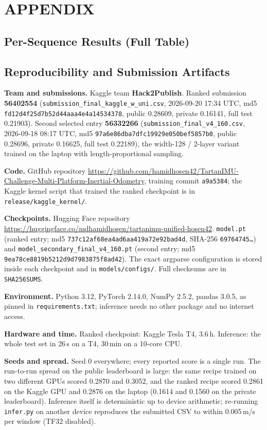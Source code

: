 \documentclass[letterpaper,10pt,conference]{ieeeconf}
\newcommand{\hfrepo}{\url{https://huggingface.co/mdhamidhosen/tartanimu-unified-hosen42}}
\newcommand{\ghrepo}{\url{https://github.com/hamidhosen42/TartanIMU-Challenge-Multi-Platform-Inertial-Odometry}}
\begin{document}
\section*{APPENDIX}
\subsection{Per-Sequence Results (Full Table)}


\subsection{Reproducibility and Submission Artifacts}
\label{sec:selection}
\begin{sloppypar}\raggedright
\textbf{Team and submissions.} Kaggle team \textbf{Hack2Publish}. Ranked submission \textbf{56402554}
(\texttt{submission\_final\_kaggle\_w\_uni.csv}, 2026-09-20 17:34 UTC, md5 \texttt{fd12d4f25d7b52d44aaa4e4a14534378},
public 0.28609, private 0.16141, full test 0.21903). Second selected entry \textbf{56332266} (\texttt{submission\_final\_v4\_160.csv},
2026-09-18 08:17 UTC, md5 \texttt{97a6e86dba7dfc19929e050bef5857b0}, public 0.28696, private 0.16625, full test 0.22189), the
width-128 / 2-layer variant trained on the laptop with length-proportional sampling.

\textbf{Code.} GitHub repository \ghrepo, training commit \texttt{a9a5384}; the Kaggle kernel script that trained the
ranked checkpoint is in \texttt{release/kaggle\_kernel/}.

\textbf{Checkpoints.} Hugging Face repository \hfrepo. \texttt{model.pt} (ranked entry; md5 \texttt{737c12af68ea4ad6aa419a72e92bad4d},
SHA-256 \texttt{69764745\ldots}) and \texttt{model\_secondary\_final\_v4\_160.pt} (second entry; md5
\texttt{9ea78ce8819b5212d9d7983875f8ad42}). The exact argparse configuration is stored inside each checkpoint and in \texttt{models/configs/}.
Full checksums are in \texttt{SHA256SUMS}.

\textbf{Environment.} Python 3.12, PyTorch 2.14.0, NumPy 2.5.2, pandas 3.0.5, as pinned in \texttt{requirements.txt};
inference needs no other package and no internet access.

\textbf{Hardware and time.} Ranked checkpoint: Kaggle Tesla T4, 3.6\,h. Inference: the whole test set in 26\,s on a T4, 30\,min on a 10-core CPU.

\textbf{Seeds and spread.} Seed 0 everywhere; every reported score is a single run. The run-to-run spread on the
public leaderboard is large: the same recipe trained on two different GPUs scored 0.2870 and 0.3052, and the ranked
recipe scored 0.2861 on the Kaggle GPU and 0.2876 on the laptop (0.1614 and 0.1560 on the private leaderboard). Inference itself is deterministic up to device
arithmetic; re-running \texttt{infer.py} on another device reproduces the submitted CSV to within 0.005\,m/s per
window (TF32 disabled).


\end{sloppypar}
\end{document}
